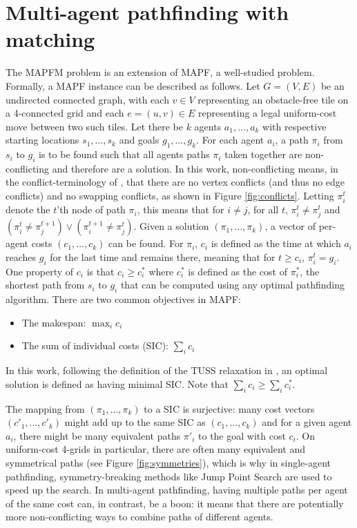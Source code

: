 \documentclass[english]{article}
\begin{document}
	\section{Multi-agent pathfinding with matching} %
	The MAPFM problem is an extension of MAPF, a well-studied problem. Formally, a MAPF instance can be described as follows. Let $G = (V,E)$ be an undirected connected graph, with each $v\in V$ representing an obstacle-free tile on a 4-connected grid and each $e = (u,v)\in E$ representing a legal uniform-cost move between two such tiles. Let there be $k$ agents $a_1,\ldots,a_k$ with respective starting locations $s_1,\ldots,s_k$ and goals $g_1,\ldots,g_k$. For each agent $a_i$, a path $\pi_i$ from $s_i$ to $g_i$ is to be found such that all agents paths $\pi_i$ taken together are non-conflicting and therefore are a solution. In this work, non-conflicting means, in the conflict-terminology of \cite{stern2019}, that there are no vertex conflicts (and thus no edge conflicts) and no swapping conflicts, as shown in Figure \ref{fig:conflicts}. Letting $\pi_i^t$ denote the $t$'th node of path $\pi_i$, this means that for $i\neq j$, for all $t$, $\pi_i^t\neq \pi_j^t$ and $(\pi_i^t \neq \pi_j^{t + 1})\lor(\pi_i^{t+1} \neq \pi_j^t)$. Given a solution $(\pi_1,\ldots,\pi_k)$, a vector of per-agent costs $(c_1,\ldots,c_k)$ can be found. For $\pi_i$, $c_i$ is defined as the time at which $a_i$ reaches $g_i$ for the last time and remains there, meaning that for $t \geq c_i$, $\pi_i^{t} = g_i$. One property of $c_i$ is that $c_i \geq c^*_i$ where $c^*_i$ is defined as the cost of $\pi^*_i$, the shortest path from $s_i$ to $g_i$ that can be computed using any optimal pathfinding algorithm. There are two common objectives in MAPF:
	\begin{itemize}
		\item The makespan: $\max_{i} c_i$
		\item The sum of individual costs (SIC): $\sum_i c_i$
	\end{itemize}
	In this work, following the definition of the TUSS relaxation in \cite{mulderij2020}, an optimal solution is defined as having minimal SIC. Note that $\sum_i c_i \geq \sum_i c^*_i$.
	
	The mapping from $(\pi_1,\ldots,\pi_k)$ to a SIC is surjective: many cost vectors $(c'_1,\ldots,c'_k)$ might add up to the same SIC as $(c_1,\ldots,c_k)$ and for a given agent $a_i$, there might be many equivalent paths $\pi'_i$ to the goal with cost $c_i$. On uniform-cost 4-grids in particular, there are often many equivalent and symmetrical paths\cite{harabor2010} (see Figure \ref{fig:symmetries}), which is why in single-agent pathfinding, symmetry-breaking methods like Jump Point Search\cite{harabor2011} are used to speed up the search. In multi-agent pathfinding, having multiple paths per agent of the same cost can, in contrast, be a boon: it means that there are potentially more non-conflicting ways to combine paths of different agents.
\end{document}
